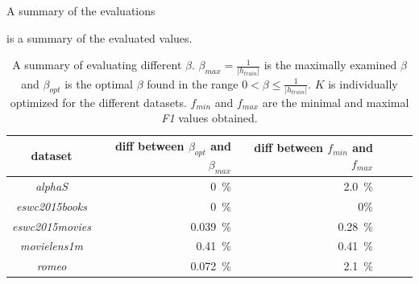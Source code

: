 \FloatBarrier

A summary of the evaluations 

 is a summary of the evaluated values.

\begin{table}[h]
    \centering
    \begin{tabular}{| c | r | r | r | r | l |}
        \hline
        \textbf{dataset}        & \textbf{diff between $\beta_{opt}$ and $\beta_{max}$ }    & \textbf{diff between $f_{min}$ and $f_{max}$} \\ \hline

        \textit{alphaS}         & 0~\%      & 2.0~\%    \\ \hline
        \textit{eswc2015books}  & 0~\%      & 0\%       \\ \hline
        \textit{eswc2015movies} & 0.039~\%  & 0.28~\%   \\ \hline
        \textit{movielens1m}    & 0.41~\%   & 0.41~\%   \\ \hline
        \textit{romeo}          & 0.072~\%  & 2.1~\%    \\ \hline


    \end{tabular}
    \caption{A summary of evaluating different $\beta$. $\beta_{max} = \frac{1}{|h_{train}|}$ is the maximally examined $\beta$ and $\beta_{opt}$ is the optimal $\beta$ found in the range $0 < \beta \leq \frac{1}{|h_{train}|}$. $K$ is individually optimized for the different datasets. $f_{min}$ and $f_{max}$ are the minimal and maximal \textit{F1} values obtained.}
    \label{tab:katzeig_beta}
\end{table}

